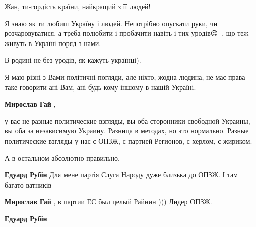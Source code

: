 \begin{itemize}
Жан, ти-гордість країни, найкращий з її людей!

Я знаю як ти любиш Україну і людей. Непотрібно опускати руки, чи
розчаровуватися, а треба полюбити і пробачити навіть і тих уродів😉🙌🏻, що теж
живуть в Україні поряд з нами.

В родині не без уродів, як кажуть українці).


Я маю різні з Вами політичні погляди, але ніхто, жодна людина, не має права
таке говорити ані Вам, ані будь-кому іншому в нашій Україні.

\begin{itemize}


\textbf{Мирослав Гай} , 

у вас не разные политические взгляды, вы оба сторонники свободной Украины, вы
оба за независимую Украину. Разница в методах, но это нормально. Разные
политические взгляды у нас с ОПЗЖ, с партией Регионов, с херлом, с жириком.

А в остальном абсолютно правильно.

 

\textbf{Едуард Рубін} Для мене партія Слуга Народу дуже близька до ОПЗЖ. І там багато ватників

 

\textbf{Мирослав Гай} , в партии ЕС был целый Райнин ))) Лидер ОПЗЖ.

 
\textbf{Едуард Рубін} 


\end{itemize}
\end{itemize}
